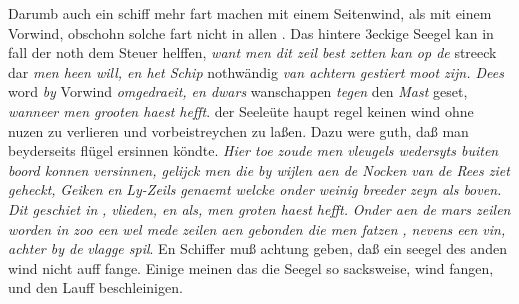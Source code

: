 \pstart Darumb  auch ein schiff\protect{} mehr fart machen mit einem Seitenwind, als mit einem Vorwind,  obschohn solche fart nicht in allen . Das hintere 3eckige Seegel\protect{} kan in fall der noth dem Steuer\protect{} helffen, \textit{want men dit zeil\protect{} best zetten kan op de} streeck dar \textit{men heen will, en het Schip}\protect{} nothw\"{a}ndig \textit{van achtern gestiert moot zijn. Dees} word \textit{by} Vorwind \textit{omgedraeit, en dwars} wanschappen \textit{tegen} den \textit{Mast}\protect{} geset, \textit{wanneer men grooten haest hefft}. 
\pend 
\pstart {} der Seele\"{u}te haupt regel keinen wind ohne nuzen zu verlieren und vorbeistreychen zu laßen. Dazu were guth, daß man beyderseits fl\"{u}gel ersinnen k\"{o}ndte. \textit{Hier toe zoude men vleugels wedersyts buiten boord konnen versinnen, gelijck men die by wijlen aen de Nocken van de Rees ziet geheckt, }\textit{Geiken}\protect{}\textit{ en }\textit{Ly-Zeils}\protect{}\textit{ genaemt welcke onder weinig breeder zeyn als boven. Dit geschiet in} \protect{}\textit{, vlieden, en als, men groten haest hefft. }
\pend 
\pstart \textit{Onder aen de mars zeilen}\protect{}\textit{ worden in zoo een }\textit{ wel mede }\textit{zeilen}\protect{}\textit{ aen gebonden die men fatzen }\textit{, nevens een vin, achter by de }\textit{vlagge spil}\protect{}. En Schiffer muß achtung geben, daß ein seegel\protect{} des anden wind nicht auff fange. Einige meinen das die Seegel\protect{} so sacksweise,  wind fangen, und den Lauff beschleinigen. 
